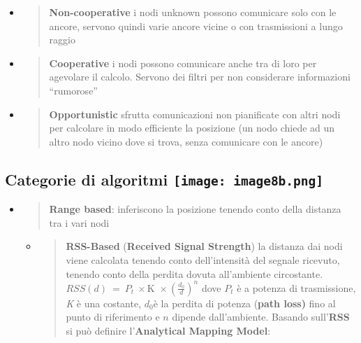 \begin{itemize}
  \begin{itemize}
  \item
    \begin{quote}
    \textbf{Non-cooperative} i nodi unknown possono comunicare solo con
    le ancore, servono quindi varie ancore vicine o con trasmissioni a
    lungo raggio
    \end{quote}
  \item
    \begin{quote}
    \textbf{Cooperative} i nodi possono comunicare anche tra di loro per
    agevolare il calcolo. Servono dei filtri per non considerare
    informazioni ``rumorose''
    \end{quote}
  \item
    \begin{quote}
    \textbf{Opportunistic} sfrutta comunicazioni non pianificate con
    altri nodi per calcolare in modo efficiente la posizione (un nodo
    chiede ad un altro nodo vicino dove si trova, senza comunicare con
    le ancore)
    \end{quote}
  \end{itemize}
\end{itemize}

\subsection[Categorie di algoritmi]{\texorpdfstring{Categorie di
algoritmi
\protect\texttt{[image: image8b.png]}}
{Categorie di algoritmi}}
\label{categorie-di-algoritmi}

\begin{itemize}
\item
  \begin{quote}
  \textbf{Range based}: inferiscono la posizione tenendo conto della
  distanza tra i vari nodi
  \end{quote}

  \begin{itemize}
  \item
    \begin{quote}
    \textbf{RSS-Based} (\textbf{Received Signal Strength}) la distanza
    dai nodi viene calcolata tenendo conto dell'intensità del segnale
    ricevuto, tenendo conto della perdita dovuta all'ambiente
    circostante.\(RSS(d)\  = \ P_{t}\  \times \text{K\ } \times (\frac{d_{0}}{d})^{n}\)
    dove \(P_{t}\) è a potenza di trasmissione, \emph{K} è una costante,
    \(d_{0}\)è la perdita di potenza (\textbf{path loss)} fino al punto
    di riferimento e \(n\) dipende dall'ambiente. Basando
    sull'\textbf{RSS} si può definire l'\textbf{Analytical Mapping
    Model}:
    \end{quote}
  \end{itemize}
\end{itemize}

